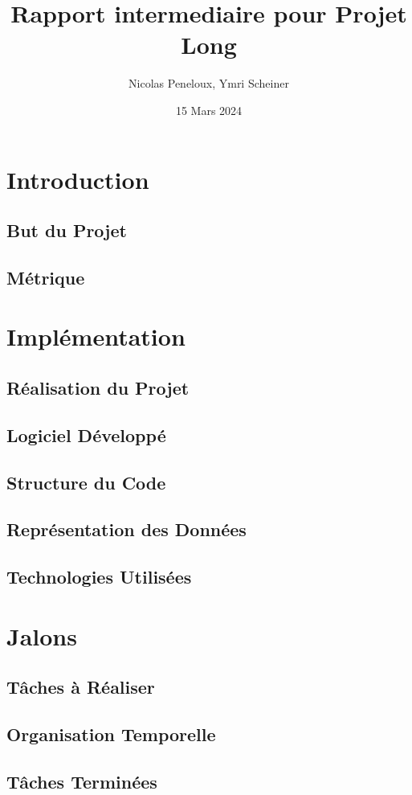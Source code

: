 \documentclass{article}
\title{Rapport intermediaire pour Projet Long}
\author{Nicolas Peneloux, Ymri Scheiner}
\date{15 Mars 2024}
\begin{document}
\maketitle

\section{Introduction}

\subsection{But du Projet}

\subsection{Métrique}

\section{Implémentation}

\subsection{Réalisation du Projet}

\subsection{Logiciel Développé}

\subsection{Structure du Code}

\subsection{Représentation des Données}

\subsection{Technologies Utilisées}

\section{Jalons}

\subsection{Tâches à Réaliser}

\subsection{Organisation Temporelle}

\subsection{Tâches Terminées}
\end{document}
